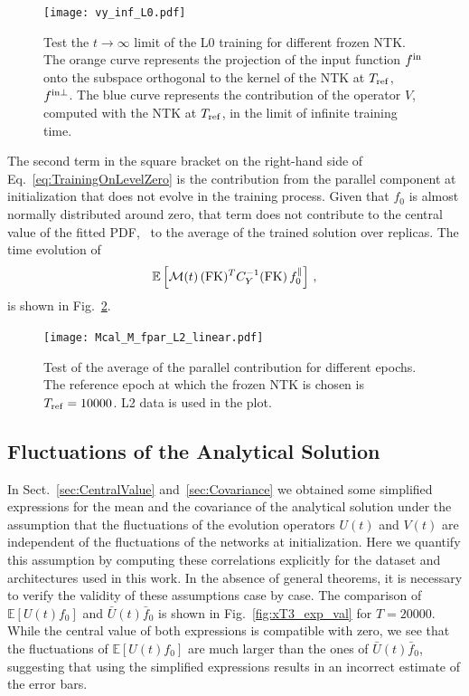 \begin{figure}[h!]
  \centering
  \texttt{[image: vy\_inf\_L0.pdf]}  
  \caption{Test the $t\to\infty$ limit of the L0 training for different frozen
  NTK. The orange curve represents the projection of the input function $f^{\rm in}$
  onto the subspace orthogonal to the kernel of the NTK at $T_{\rm ref}$, \ie\
  $f^{\rm in \perp}$. The blue curve represents the contribution of the operator $V$,
  computed with the NTK at $T_{\rm ref}$, in the limit of infinite training
  time.}
  \label{fig:InfiniteTimeVterm}
\end{figure}

The second term in the square bracket on the right-hand side of
Eq.~\eqref{eq:TrainingOnLevelZero} is the contribution from the parallel
component at initialization that does not evolve in the training process. Given
that $f_0$ is almost normally distributed around zero, that term does not
contribute to the central value of the fitted PDF, \ie\ to the average of the
trained solution over replicas. The time evolution of 
\begin{align}
  \label{eq:AverageLevelZeroUcheck}
  \mathbb{E}\left[\mathcal{M}(t)\, (\mathrm{FK})^T C_{Y}^{-1} (\mathrm{FK})\, 
    f_{0}^\parallel\right]\, ,
\end{align}
is shown in Fig.~\ref{fig:AverageLevelZeroUcheck}.
\begin{figure}[h!]
  \centering
  \texttt{[image: Mcal\_M\_fpar\_L2\_linear.pdf]} 
  \caption{Test of the average of the parallel contribution for different
  epochs. The reference epoch at which the frozen NTK is chosen is $T_{\rm ref}
  = 10000$. L2 data is used in the plot.}
  \label{fig:AverageLevelZeroUcheck}
\end{figure}

\FloatBarrier

\subsection{Fluctuations of the Analytical Solution}
\label{sec:CheckCovariance}

In Sect.~\ref{sec:CentralValue} and~\ref{sec:Covariance} we obtained some
simplified expressions for the mean and the covariance of the analytical
solution under the assumption that the fluctuations of the evolution operators
$U(t)$ and $V(t)$ are independent of the fluctuations of the networks at
initialization. Here we quantify this assumption by computing these correlations
explicitly for the dataset and architectures used in this work. In the absence
of general theorems, it is necessary to verify the validity of these assumptions
case by case. The comparison of $\mathbb{E}\left[U(t) f_{0}\right]$ and
$\bar{U}(t) \bar{f}_{0}$ is shown in Fig.~\ref{fig:xT3_exp_val} for $T=20000$.
While the central value of both expressions is compatible with zero, we see that
the fluctuations of $\mathbb{E}\left[U(t) f_{0}\right]$ are much larger than the
ones of $\bar{U}(t) \bar{f}_{0}$, suggesting that using the simplified
expressions results in an incorrect estimate of the error bars. 


